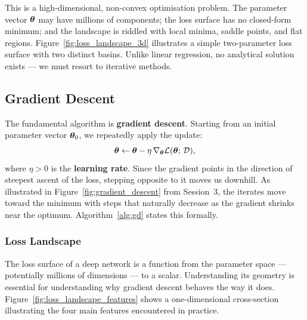 This is a high-dimensional, non-convex optimisation problem. The parameter vector $\boldsymbol{\theta}$ may have millions of components; the loss surface has no closed-form minimum; and the landscape is riddled with local minima, saddle points, and flat regions. Figure~\ref{fig:loss_landscape_3d} illustrates a simple two-parameter loss surface with two distinct basins. Unlike linear regression, no analytical solution exists — we must resort to iterative methods.


\subsection{Gradient Descent}

The fundamental algorithm is \textbf{gradient descent}. Starting from an initial parameter vector $\boldsymbol{\theta}_0$, we repeatedly apply the update:
\begin{equation}
    \boldsymbol{\theta} \leftarrow \boldsymbol{\theta} - \eta\,\nabla_{\boldsymbol{\theta}} \mathcal{L}(\boldsymbol{\theta};\, \mathcal{D}),
    \label{eq:gd_update}
\end{equation}
where $\eta > 0$ is the \textbf{learning rate}. Since the gradient points in the direction of steepest ascent of the loss, stepping opposite to it moves us downhill. As illustrated in Figure~\ref{fig:gradient_descent} from Session~3, the iterates move toward the minimum with steps that naturally decrease as the gradient shrinks near the optimum. Algorithm~\ref{alg:gd} states this formally.

\begin{algorithm}[H]
\DontPrintSemicolon
{}
\caption{Gradient Descent}
\label{alg:gd}
\end{algorithm}

\subsubsection{Loss Landscape}

The loss surface of a deep network is a function from the parameter space — potentially millions of dimensions — to a scalar. Understanding its geometry is essential for understanding why gradient descent behaves the way it does. Figure~\ref{fig:loss_landscape_features} shows a one-dimensional cross-section illustrating the four main features encountered in practice.

